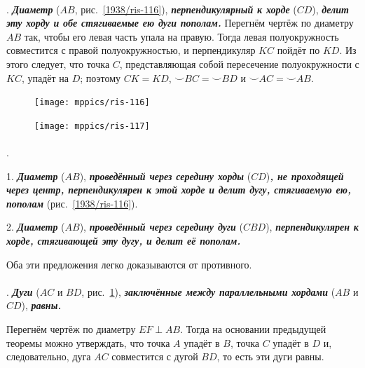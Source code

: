 \documentclass[oneside]{book}
\begin{document}
\paragraph{}\label{1938/105}
\mbox{.}
\textbf{\emph{Диаметр}} ($AB$, рис.~\ref{1938/ris-116}), \textbf{\emph{перпендикулярный к хорде}} ($CD$), \textbf{\emph{делит эту хорду и обе стягиваемые ею дуги пополам.}}
Перегнём чертёж по диаметру $AB$ так, чтобы его левая часть упала на правую.
Тогда левая полуокружность совместится с правой полуокружностью, и перпендикуляр $KC$ пойдёт по $KD$.
Из этого следует, что точка $C$, представляющая собой пересечение полуокружности с $KC$, упадёт на $D$;
поэтому $CK=KD$,
${\smallsmile} BC={\smallsmile} BD$ и
${\smallsmile} AC={\smallsmile} AB$.

{

\begin{figure}
\centering
\texttt{[image: mppics/ris-116]}
\caption{}\label{1938/ris-116}
\bigskip
\texttt{[image: mppics/ris-117]}
\caption{}\label{1938/ris-117}
\end{figure}

\paragraph{}\label{1938/106}
\mbox{.}

1.
\textbf{\emph{Диаметр}} ($AB$), \textbf{\emph{проведённый через середину хорды}} ($CD$)\textbf{\emph{, не проходящей через центр, перпендикулярен к этой хорде и делит дугу, стягиваемую ею, пополам}} (рис.~\ref{1938/ris-116}).


2.
\textbf{\emph{Диаметр}} ($AB$), \textbf{\emph{проведённый через середину дуги}} ($CBD$), \textbf{\emph{перпендикулярен к хорде, стягивающей эту дугу, и делит её пополам.}}

Оба эти предложения легко доказываются от противного.


\paragraph{}\label{1938/107}
\mbox{.}
\textbf{\emph{Дуги}} ($AC$ и $BD$, рис.~\ref{1938/ris-117}), \textbf{\emph{заключённые между параллельными хордами}} ($AB$ и $CD$), \textbf{\emph{равны.}}

Перегнём чертёж по диаметру $EF\perp AB$.
Тогда на основании предыдущей теоремы можно утверждать, что точка $A$ упадёт в $B$, точка $C$ упадёт в $D$ и, следовательно, дуга $AC$ совместится с дугой $BD$, то есть эти дуги равны.

}
\end{document}
